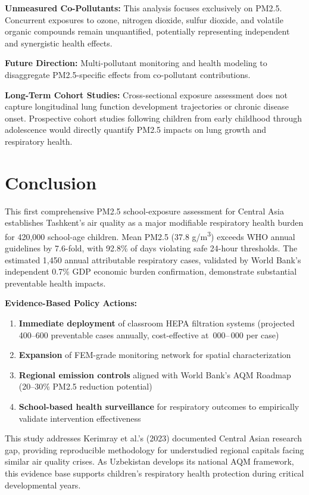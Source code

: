 \documentclass[11pt,a4paper]{article}
\begin{document}
\textbf{Unmeasured Co-Pollutants:} This analysis focuses exclusively on PM2.5. Concurrent exposures to ozone, nitrogen dioxide, sulfur dioxide, and volatile organic compounds remain unquantified, potentially representing independent and synergistic health effects.

\textbf{Future Direction:} Multi-pollutant monitoring and health modeling to disaggregate PM2.5-specific effects from co-pollutant contributions.

\textbf{Long-Term Cohort Studies:} Cross-sectional exposure assessment does not capture longitudinal lung function development trajectories or chronic disease onset. Prospective cohort studies following children from early childhood through adolescence would directly quantify PM2.5 impacts on lung growth and respiratory health.

\section{Conclusion}

This first comprehensive PM2.5 school-exposure assessment for Central Asia establishes Tashkent's air quality as a major modifiable respiratory health burden for 420,000 school-age children. Mean PM2.5 (37.8 \textmu g/m\textsuperscript{3}) exceeds WHO annual guidelines by 7.6-fold, with 92.8\% of days violating safe 24-hour thresholds. The estimated 1,450 annual attributable respiratory cases, validated by World Bank's independent 0.7\% GDP economic burden confirmation, demonstrate substantial preventable health impacts.

\textbf{Evidence-Based Policy Actions:}
\begin{enumerate}
    \item \textbf{Immediate deployment} of classroom HEPA filtration systems (projected 400--600 preventable cases annually, cost-effective at \,000--\,000 per case)
    \item \textbf{Expansion} of FEM-grade monitoring network for spatial characterization
    \item \textbf{Regional emission controls} aligned with World Bank's AQM Roadmap (20--30\% PM2.5 reduction potential)
    \item \textbf{School-based health surveillance} for respiratory outcomes to empirically validate intervention effectiveness
\end{enumerate}

This study addresses Kerimray et al.'s (2023) documented Central Asian research gap, providing reproducible methodology for understudied regional capitals facing similar air quality crises. As Uzbekistan develops its national AQM framework, this evidence base supports children's respiratory health protection during critical developmental years.
\end{document}
